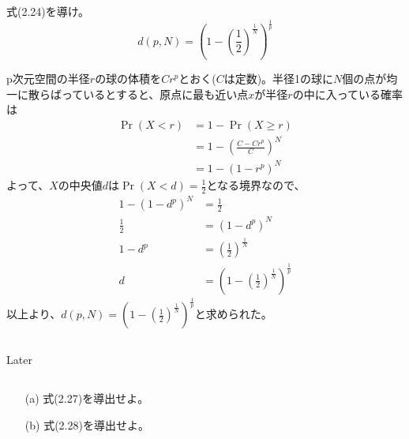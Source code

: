 \documentclass{jsarticle}
\begin{document}
\subsection{}

\begin{shadebox}
式(2.24)を導け。
\[d(p,N)=(1-(\frac{1}{2})^{\frac{1}{N}})^{\frac{1}{p}}\]
\end{shadebox}
p次元空間の半径$r$の球の体積を$Cr^p$とおく($C$は定数)。半径1の球に$N$個の点が均一に散らばっているとすると、原点に最も近い点$x$が半径$r$の中に入っている確率は
\begin{align*}
\Pr(X<r)&=1-\Pr(X\geq r)\\
&=1-(\frac{C-Cr^p}{C})^N\\
&=1-(1-r^p)^N
\end{align*}
よって、$X$の中央値$d$は$\Pr(X<d)=\frac{1}{2}$となる境界なので、
\begin{align*}
1-(1-d^p)^N&=\frac{1}{2}\\
\frac{1}{2}&=(1-d^p)^N\\
1-d^p&=(\frac{1}{2})^\frac{1}{N}\\
d&=(1-(\frac{1}{2})^\frac{1}{N})^\frac{1}{p}
\end{align*}
以上より、$d(p,N)=(1-(\frac{1}{2})^\frac{1}{N})^\frac{1}{p}$と求められた。


\subsection{}
Later




\subsection{}
\begin{shadebox}
\begin{enumerate}
\item[(a)]
式(2.27)を導出せよ。
\item[(b)]
式(2.28)を導出せよ。
\end{enumerate}
\end{shadebox}
\end{document}
